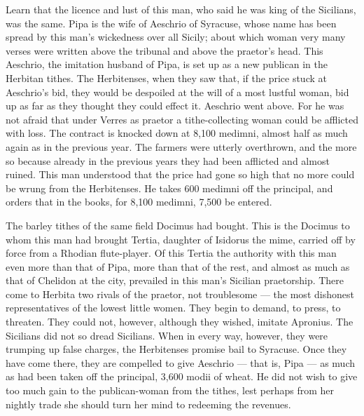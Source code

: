  Learn that the licence and lust of this man, who said he was king of the Sicilians, was the same. Pipa is the wife of Aeschrio of Syracuse, whose name has been spread by this man's wickedness over all Sicily; about which woman very many verses were written above the tribunal and above the praetor's head. This Aeschrio, the imitation husband of Pipa, is set up as a new publican in the Herbitan tithes. The Herbitenses, when they saw that, if the price stuck at Aeschrio's bid, they would be despoiled at the will of a most lustful woman, bid up as far as they thought they could effect it. Aeschrio went above. For he was not afraid that under Verres as praetor a tithe-collecting woman could be afflicted with loss. The contract is knocked down at 8,100 medimni, almost half as much again as in the previous year. The farmers were utterly overthrown, and the more so because already in the previous years they had been afflicted and almost ruined. This man understood that the price had gone so high that no more could be wrung from the Herbitenses. He takes 600 medimni off the principal, and orders that in the books, for 8,100 medimni, 7,500 be entered.

 The barley tithes of the same field Docimus had bought. This is the Docimus to whom this man had brought Tertia, daughter of Isidorus the mime, carried off by force from a Rhodian flute-player. Of this Tertia the authority with this man even more than that of Pipa, more than that of the rest, and almost as much as that of Chelidon at the city, prevailed in this man's Sicilian praetorship. There come to Herbita two rivals of the praetor, not troublesome --- the most dishonest representatives of the lowest little women. They begin to demand, to press, to threaten. They could not, however, although they wished, imitate Apronius. The Sicilians did not so dread Sicilians. When in every way, however, they were trumping up false charges, the Herbitenses promise bail to Syracuse. Once they have come there, they are compelled to give Aeschrio --- that is, Pipa --- as much as had been taken off the principal, 3,600 modii of wheat. He did not wish to give too much gain to the publican-woman from the tithes, lest perhaps from her nightly trade she should turn her mind to redeeming the revenues.

